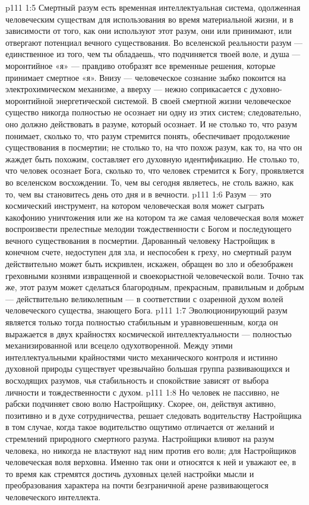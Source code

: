 \vs p111 1:5 Смертный разум есть временная интеллектуальная система, одолженная человеческим существам для использования во время материальной жизни, и в зависимости от того, как они используют этот разум, они или принимают, или отвергают потенциал вечного существования. Во вселенской реальности разум --- единственное из того, чем ты обладаешь, что подчиняется твоей воле, и душа --- моронтийное «я» --- правдиво отобразят все временные решения, которые принимает смертное «я». Внизу --- человеческое сознание зыбко покоится на электрохимическом механизме, а вверху --- нежно соприкасается с духовно\hyp{}моронтийной энергетической системой. В своей смертной жизни человеческое существо никогда полностью не осознает ни одну из этих систем; следовательно, оно должно действовать в разуме, который осознает. И не столько то, что разум понимает, сколько то, что разум стремится понять, обеспечивает продолжение существования в посмертии; не столько то, на что похож разум, как то, на что он жаждет быть похожим, составляет его духовную идентификацию. Не столько то, что человек осознает Бога, сколько то, что человек стремится к Богу, проявляется во вселенском восхождении. То, чем вы сегодня являетесь, не столь важно, как то, чем вы становитесь день ото дня и в вечности.
\vs p111 1:6 Разум --- это космический инструмент, на котором человеческая воля может сыграть какофонию уничтожения или же на котором та же самая человеческая воля может воспроизвести прелестные мелодии тождественности с Богом и последующего вечного существования в посмертии. Дарованный человеку Настройщик в конечном счете, недоступен для зла, и неспособен к греху, но смертный разум действительно может быть искривлен, искажен, обращен во зло и обезображен греховными кознями извращенной и своекорыстной человеческой воли. Точно так же, этот разум может сделаться благородным, прекрасным, правильным и добрым --- действительно великолепным --- в соответствии с озаренной духом волей человеческого существа, знающего Бога.
\vs p111 1:7 \pc Эволюционирующий разум является только тогда полностью стабильным и уравновешенным, когда он выражается в двух крайностях космической интеллектуальности --- полностью механизированной или всецело одухотворенной. Между этими интеллектуальными крайностями чисто механического контроля и истинно духовной природы существует чрезвычайно большая группа развивающихся и восходящих разумов, чья стабильность и спокойствие зависят от выбора личности и тождественности с духом.
\vs p111 1:8 Но человек не пассивно, не рабски подчиняет свою волю Настройщику. Скорее, он, действуя активно, позитивно и в духе сотрудничества, решает следовать водительству Настройщика в том случае, когда такое водительство ощутимо отличается от желаний и стремлений природного смертного разума. Настройщики влияют на разум человека, но никогда не властвуют над ним против его воли; для Настройщиков человеческая воля верховна. Именно так они и относятся к ней и уважают ее, в то время как стремятся достичь духовных целей настройки мысли и преобразования характера на почти безграничной арене развивающегося человеческого интеллекта.
